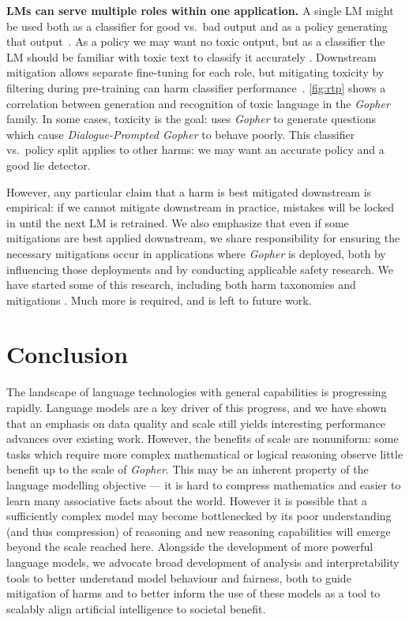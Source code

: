 \documentclass[11pt, a4paper, logo, internal, copyright, nonumbering]{deepmind}
\newcommand{\gopher}{\textit{Gopher}\xspace}
\newcommand{\gopherchat}{\textit{Dialogue-Prompted Gopher}\xspace}
\begin{document}
\textbf{LMs can serve multiple roles within one application.} A single LM might be used both as a classifier for good vs.\ bad output and as a policy generating that output~\citep{stiennon2020learning}.  As a policy we may want no toxic output, but as a classifier the LM should be familiar with toxic text to classify it accurately \citep{buckman2021problematic}.  Downstream mitigation allows separate fine-tuning for each role, but mitigating toxicity by filtering during pre-training can harm classifier performance~\citep{welbl2021challenges}. \autoref{fig:rtp} shows a correlation between generation and recognition of toxic language in the \gopher family. In some cases, toxicity is the goal: \citet{perez2021redteaming} uses \gopher to generate questions which cause \gopherchat to behave poorly.  This classifier vs.\ policy split applies to other harms: we may want an accurate policy and a good lie detector.
    
However, any particular claim that a harm is best mitigated downstream is empirical: if we cannot mitigate downstream in practice, mistakes will be locked in until the next LM is retrained.  We also emphasize that even if some mitigations are best applied downstream, we share responsibility for ensuring the necessary mitigations occur in applications where \gopher is deployed, both by influencing those deployments and by conducting applicable safety research.
We have started some of this research, including both harm taxonomies \citep{weidinger2021harms,kenton2021alignment} and mitigations \citep{welbl2021challenges,perez2021redteaming}.  Much more is required, and is left to future work. 

\section{Conclusion}
The landscape of language technologies with general capabilities is progressing rapidly.  Language models are a key driver of this progress, and we have shown that an emphasis on data quality and scale still yields interesting performance advances over existing work.  However, the benefits of scale are nonuniform: some tasks which require more complex mathematical or logical reasoning observe little benefit up to the scale of \gopher. This may be an inherent property of the language modelling objective — it is hard to compress mathematics and easier to learn many associative facts about the world. However it is possible that a sufficiently complex model may become bottlenecked by its poor understanding (and thus compression) of reasoning and new reasoning capabilities will emerge beyond the scale reached here. Alongside the development of more powerful language models, we advocate broad development of analysis and interpretability tools to better understand model behaviour and fairness, both to guide mitigation of harms and to better inform the use of these models as a tool to scalably align artificial intelligence to societal benefit.
\end{document}

